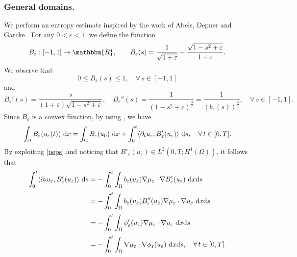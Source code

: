 \documentclass[11pt,  reqno]{amsart}%
\theoremstyle{plain}
\theoremstyle{definition}
\theoremstyle{remark}
\numberwithin{equation}{section}
\newcommand{\ve}{\varepsilon}
\newcommand{\dx}{\textup{d}x}
\begin{document}
\subsubsection{General domains.} We perform an entropy estimate inspired by the work of Abels, Depner and Garcke \cite{ADG2013-2}.
For any $0<\varepsilon<1$, we define the function
$$
B_\varepsilon: [-1,1] \to \mathbbm{R}, \qquad B_\varepsilon(s)= \frac{1}{\sqrt{1+\varepsilon}} - \frac{\sqrt{1-s^2+\varepsilon}}{1+\varepsilon}.
$$
We observe that
\begin{equation}
\label{B_ve prop}
0\leq B_\varepsilon(s)\leq 1, \quad \forall \, s \in [-1,1]
\end{equation}
and
$$
B_\varepsilon'(s)= \frac{s}{(1+\varepsilon)\sqrt{1-s^2+\varepsilon}},
\quad
 B_\varepsilon''(s)= \frac{1}{\left( 1-s^2+\varepsilon\right)^\frac32}=\frac{1}{\left( b_\varepsilon(s)\right)^\frac32}, \quad \forall \, s \in [-1,1].
$$
Since $B_\varepsilon$ is a convex function, by using \cite[Lemma 4.1]{RS}, we have
$$
\int_\Omega B_\ve (u_\ve(t)) \ \dx 
=\int_\Omega B_\ve (u_0) \ \dx +  \int_0^t \langle \partial_t u_\ve, B'_\ve(u_\ve) \rangle \ \mathrm{d}s, \quad \forall \, t \in [0,T].
$$
By exploiting \eqref{ueps} and noticing that $B'_\varepsilon(u_\ve) \in L^2(0,T;H^1(\Omega))$, it follows that 
\begin{align*}
\int_0^t \langle \partial_t u_\ve, B'_\ve(u_\ve) \rangle \ \mathrm{d}s
&= 
-  \int_0^t \int_\Omega b_\ve (u_\ve) \nabla \mu_\ve \cdot  \nabla B'_\ve(u_\ve)  \ \dx \mathrm{d}s
\\[3pt]
&= 
-  \int_0^t \int_\Omega b_\ve (u_\ve) B''_\ve(u_\ve) \nabla \mu_\ve \cdot \nabla u_\ve \ \dx \mathrm{d}s
\\[3pt]
&= 
-  \int_0^t \int_\Omega \phi'_\ve (u_\ve) \nabla \mu_\ve \cdot \nabla u_\ve  \ \dx \mathrm{d}s
\\[3pt]
&= 
-  \int_0^t \int_\Omega  \nabla \mu_\ve \cdot \nabla \phi_\ve(u_\ve) \ \dx \mathrm{d}s,
\quad \forall \, t \in [0,T].
\end{align*}
\end{document}
